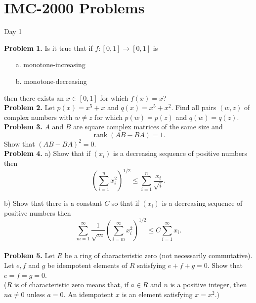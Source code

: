 \documentclass{article}
\begin{document}
\pagestyle{plain}

\section*{IMC-2000 Problems}

\begin{center}
Day 1
\end{center}

\textbf{Problem 1.}
Is it true that if \( f : [0, 1] \to [0, 1] \) is
\begin{itemize}
  \item[a.] monotone-increasing
  \item[b.] monotone-decreasing
\end{itemize}
then there exists an \( x \in [0,1] \) for which \( f(x) = x \)?
\\

\textbf{Problem 2.}
Let \( p(x) = x^5 + x \) and \( q(x) = x^5 + x^2 \).
Find all pairs \( (w, z) \) of complex numbers with \( w \neq z \) for which \( p(w) = p(z) \) and \( q(w) = q(z) \).
\\

\textbf{Problem 3.}
\( A \) and \( B \) are square complex matrices of the same size and
\[
\operatorname{rank}(AB - BA) = 1.
\]
Show that \( (AB - BA)^2 = 0 \).\\

\textbf{Problem 4.}
a) Show that if \( (x_i) \) is a decreasing sequence of positive numbers then
\[
\left( \sum_{i=1}^{n} x_i^2 \right)^{1/2} \leq \sum_{i=1}^{n} \frac{x_i}{\sqrt{i}}.
\]

\vspace{0.5em}

b) Show that there is a constant \( C \) so that if \( (x_i) \) is a decreasing sequence of positive numbers then
\[
\sum_{m=1}^{\infty} \frac{1}{\sqrt{m}} \left( \sum_{i=m}^{\infty} x_i^2 \right)^{1/2} \leq C \sum_{i=1}^{\infty} x_i.
\]
\\

\textbf{Problem 5.}
Let \( R \) be a ring of characteristic zero (not necessarily commutative).
Let \( e, f \) and \( g \) be idempotent elements of \( R \) satisfying \( e + f + g = 0 \).
Show that \( e = f = g = 0 \).\\

\noindent
(\( R \) is of characteristic zero means that, if \( a \in R \) and \( n \) is a positive integer,
then \( na \neq 0 \) unless \( a = 0 \).
An idempotent \( x \) is an element satisfying \( x = x^2 \).)
\\
\end{document}
